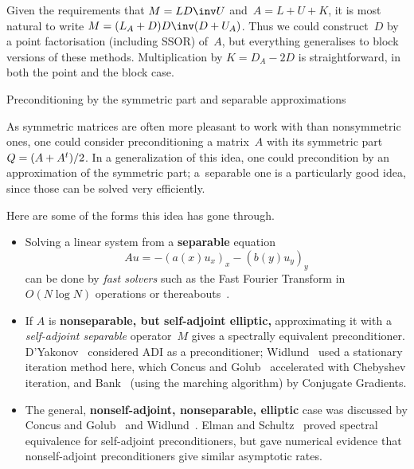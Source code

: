 \documentclass[11pt]{artikel3}
\begin{document}
\begin{Outline}
Given the requirements that $M=LD\inv U$ and~$A=L+U+K$,
it is most natural to write $M=(L_A+D)D\inv(D+U_A)$.
Thus we could construct~$D$ by a point factorisation (including SSOR)
of~$A$, but everything generalises to block versions of these methods.
Multiplication by $K=D_A-2D$ is straightforward, in both the
point and the block case.

\begin{comment}
\Level 0 {$A$-orthogonalization}

If $Q$ and $P$ are not orthogonalized under the usual inner
product, but under $(A\cdot,\cdot)$ instead, a tridiagonalization
of $A^2$ is found: if $Q^tAP=\Omega$ with $\Omega$ diagonal,
then \begin{eqnarray*}Q^tA^2=Q^tA(AP)&=&Q^tAP(J+U)=\Omega(J+U)\\
        &=&(Q^tA)AP=(J^t+V^t)Q^tAP=(J^t+V^t)\Omega
\end{eqnarray*}
\end{comment}

 {Preconditioning by the symmetric part and separable approximations}

As symmetric matrices are often more pleasant to work with than
nonsymmetric ones, one could consider preconditioning a matrix~$A$
with its symmetric part~$Q=\nobreak(A+A^t)/2$.
In a generalization of this idea, one could precondition by an
approximation of the symmetric part; a~separable one is a particularly
good idea, since those can be solved very efficiently.

Here are some of the forms this idea has gone through.

\begin{itemize}
\item Solving a linear system from a {\bf separable} equation
\[ Au = -(a(x)u_x)_x-(b(y)u_y)_y \]
can be done by {\em fast solvers} such as the Fast Fourier Transform
in $O(N\log N)$ operations or thereabouts~\cite{Sw:poissonrectangle}.
\item If $A$ is {\bf nonseparable, but self-adjoint elliptic,}
  approximating it with a {\em self-adjoint separable} operator~$M$
  gives a spectrally equivalent
  preconditioner. D'Yakonov~\cite{DY:adi} considered ADI as a
  preconditioner; Widlund~\cite{Wi:fastseparable} used a stationary
  iteration method here, which Concus and
  Golub~\cite{CoGo:nonseparable} accelerated with Chebyshev iteration,
  and Bank~\cite{Ba:marching} (using the marching algorithm) by Conjugate Gradients.
\item The general, {\bf nonself-adjoint, nonseparable, elliptic} case
  was discussed by Concus and Golub~\cite{CoGo:cgnonsymmetric} and
  Widlund~\cite{Wi:nonsymm}. Elman and Schultz~\cite{ElSc:fastdirect}
  proved spectral equivalence for self-adjoint preconditioners, but
  gave numerical evidence that nonself-adjoint preconditioners give
  similar asymptotic rates.
\end{itemize}


\end{Outline}
\end{document}
